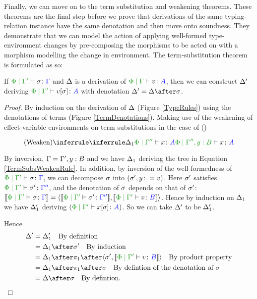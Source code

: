 \documentclass{Report}
\begin{document}
Finally, we can move on to the term substitution and weakening theorems. These theorems are the final step before we prove that derivations of the same typing-relation instance have the same denotation and then move onto soundness. They demonstrate that we can model the action of applying well-formed type-environment changes by pre-composing the morphisms to be acted on with a morphism modelling the change in environment. The term-substitution theorem is formulated as so: 

\begin{framed}
    \begin{theorem}\label{TermSubstitutionOnTerms}
        If $\etyperelation{\P}{\G'}{\si}{\G}$ and $\Delta$ is a derivation of $\gpetyperelation{v}{A}$, then we can construct $\Delta'$ deriving $\etyperelation{\P}{\G'}{v\ssi}{A}$ with denotation $\D' = \D \after \si$.
    \end{theorem}
    
    
    \begin{proof}
        By induction on the derivation of $\Delta$ (Figure \ref{TypeRules}) using the denotations of terms (Figure \ref{TermDenotations}). Making use of the weakening of effect-variable environments on term substitutions in the case of (\textit{\vgen})
    
    \case{\vweaken}
    
    \begin{equation} \label{TermSubsWeakenRule}
        \ntreeruleI{\vweaken}{\treeruleI{\D_1}{\etyperelation{\P}{\G''}{x}{A}}}{\etyperelation{\P}{\G'',y: B}{x}{A}}
    \end{equation}
    
    By inversion, $\Gamma = \Gamma', y:B$ and we have $\Delta_1$ deriving the tree in Equation \ref{TermSubsWeakenRule}. In addition, by inversion of the well-formedness of $\etyperelation{\P}{\G'}{\si}{\G}$, we can decompose $\sigma$ into $(\sigma', y\colon= v)$. Here $\sigma'$ satisfies $\etyperelation{\P}{\G'}{\si'}{\G''}$, and the denotation of $\sigma$ depends on that of $\sigma'$: $\deno{\etyperelation{\P}{\G'}{\si}{\G}} = \pr{\deno{\etyperelation{\P}{\G'}{\si'}{\G''}}}{\deno{\etyperelation{\P}{\G'}{v}{B}}}$. Hence by induction on $\Delta_1$ we have $\Delta_1'$ deriving $(\etyperelation{\P}{\G'}{x\ssi}{A})$. So we can take $\Delta'$ to be $\Delta_1'$.
    
    Hence
    \begin{align*}
        \D' & = \D_1' \qt{By definition}\\
            & = \D_1\after\si'\qt{By induction}\\
            & = \D_1\after\p\after\pr{\si'}{\deno{\etyperelation{\P}{\G'}{v}{B}}}\qt{By product property}\\
            & = \D_1\after\p\after\si\qt{By defintion of the denotation of $\si$}\\
            & = \D\after\si\qt{By defintion.}
    \end{align*}
    

\end{proof}
\end{framed}
\end{document}
